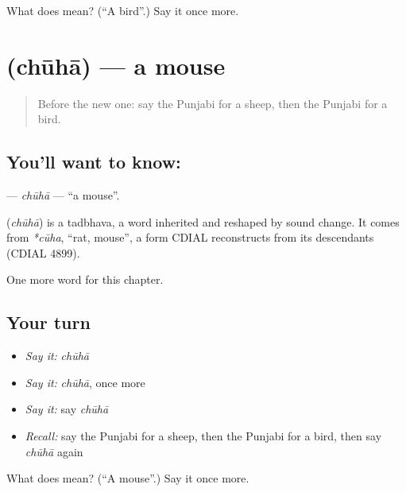 \begin{tcolorbox}[breakable,colback=teal!4,colframe=teal!35!black,title={Before you move on}]
What does  mean? (\textquotedblleft{}A bird\textquotedblright{}.) Say it once more.
\end{tcolorbox}
\section[\texorpdfstring{\pa{ਚੂਹਾ} (chūhā)}{ਚੂਹਾ (chūhā)}]{ (chūhā) — a mouse}

\label{lesson:PA-C78-chuha}



\begin{quote}
Before the new one: say the Punjabi for a sheep, then the Punjabi for a bird.
\end{quote}

\subsection*{You'll want to know: }
\textbf{} — \emph{chūhā} — \textquotedblleft{}a mouse\textquotedblright{}.

\begin{cousinweb}
\textbf{} (\emph{chūhā}) is a tadbhava, a word inherited and reshaped by sound change. It comes from \emph{*cūha}, \textquotedblleft{}rat, mouse\textquotedblright{}, a form CDIAL reconstructs from its descendants (CDIAL 4899).
\end{cousinweb}

\begin{grammarlens}[title={What you've built}]
One more word for this chapter.
\end{grammarlens}

\subsection*{Your turn}
\begin{itemize}
\raggedright
  \item \emph{Say it:} \emph{chūhā}
  \item \emph{Say it:} \emph{chūhā}, once more
  \item \emph{Say it:} say \emph{chūhā}
  \item \emph{Recall:} say the Punjabi for a sheep, then the Punjabi for a bird, then say \emph{chūhā} again
\end{itemize}

\begin{tcolorbox}[breakable,colback=teal!4,colframe=teal!35!black,title={Before you move on}]
What does  mean? (\textquotedblleft{}A mouse\textquotedblright{}.) Say it once more.
\end{tcolorbox}

